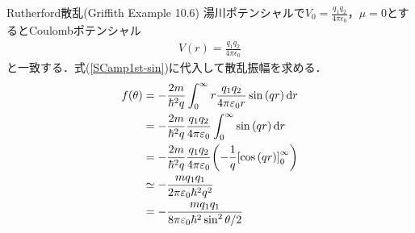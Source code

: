 \documentclass{report}
\begin{document}
  \begin{myex}{Rutherford散乱(Griffith Example 10.6)}{}
    湯川ポテンシャルで$V_0 = \frac{q_1q_2}{4\pi \epsilon_0}$，$\mu = 0$とするとCoulombポテンシャル
    \begin{align}
      V(r) = \frac{q_1q_2}{4\pi\epsilon_0}
    \end{align}
    と一致する．式(\ref{SCamp1st-sin})に代入して散乱振幅を求める．
    \begin{align}
      f(\theta) &= - \frac{2m}{\hbar^2q} \int_{0}^{\infty} r \frac{q_1q_2}{4\pi\varepsilon_0 r} \sin\qty(qr) \dd{r}\\
      &= -\frac{2m}{\hbar^2q}\frac{q_1q_2}{4\pi\varepsilon_0}\int_{0}^{\infty} \sin\qty(qr) \dd{r} \\
      &=  -\frac{2m}{\hbar^2q}\frac{q_1q_2}{4\pi\varepsilon_0}\qty(-\frac{1}{q}\qty[\cos\qty(qr)]_0^{\infty})\\
      &\simeq - \frac{mq_1q_1}{2\pi\varepsilon_0\hbar^2q^2}\\
      &= - \frac{mq_1q_1}{8\pi\varepsilon_0\hbar^2 \sin^2 \theta/2}
    \end{align}
  \end{myex}
\end{document}
